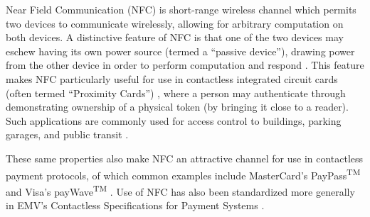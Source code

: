 Near Field Communication (NFC) is short-range wireless channel which permits two devices to communicate wirelessly,
    allowing for arbitrary computation on both devices.
A distinctive feature of NFC is that one of the two devices may eschew having its own power source (termed a ``passive device''),
    drawing power from the other device in order to perform computation and respond \cite{nfcspec}.
This feature makes NFC particularly useful for use in contactless integrated circuit cards (often termed ``Proximity Cards'') \cite{nfciso},
    where a person may authenticate through demonstrating ownership of a physical token (by bringing it close to a reader).
Such applications are commonly used for access control to buildings, parking garages, and public transit \cite{finvzgar2011use, roberts2006radio, tamrakar2011identity, weinstein2005rfid}.

These same properties also make NFC an attractive channel for use in contactless payment protocols,
    of which common examples include MasterCard's PayPass\textsuperscript{TM} \cite{paypass} and Visa's payWave\textsuperscript{TM} \cite{paywave}.
Use of NFC has also been standardized more generally in EMV's Contactless Specifications for Payment Systems \cite{emv}.
